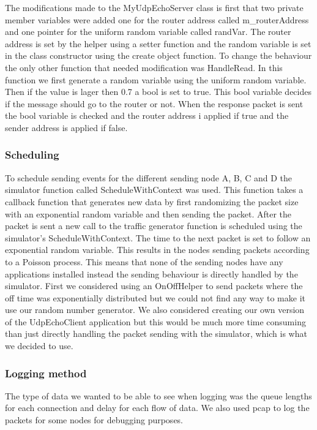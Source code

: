 \documentclass{article}
\begin{document}
The modifications made to the MyUdpEchoServer class is first that two private member variables were added one for the router address called m\_routerAddress and one pointer for the uniform random variable called randVar.
The router address is set by the helper using a setter function and the random variable is set in the class constructor using the create object function.
To change the behaviour the only other function that needed modification was HandleRead.
In this function we first generate a random variable using the uniform random variable.
Then if the value is lager then 0.7 a bool is set to true.
This bool variable decides if the message should go to the router or not.
When the response packet is sent the bool variable is checked and the router address i applied if true and the sender address is applied if false.

\subsubsection{Scheduling}
To schedule sending events for the different sending node A, B, C and D the simulator function called ScheduleWithContext was used.
This function takes a callback function that generates new data by first randomizing the packet size with an exponential random variable and then sending the packet.
After the packet is sent a new call to the traffic generator function is scheduled using the simulator's ScheduleWithContext.
The time to the next packet is set to follow an exponential random variable.
This results in the nodes sending packets according to a Poisson process.
This means that none of the sending nodes have any applications installed instead the sending behaviour is directly handled by the simulator.
First we considered using an OnOffHelper to send packets where the off time was exponentially distributed but we could not find any way to make it use our random number generator.
We also considered creating our own version of the UdpEchoClient application but this would be much more time consuming than just directly handling the packet sending with the simulator, which is what we decided to use.

\subsubsection{Logging method}
The type of data we wanted to be able to see when logging was the queue lengths for each connection and delay for each flow of data.
We also used pcap to log the packets for some nodes for debugging purposes.
\end{document}
